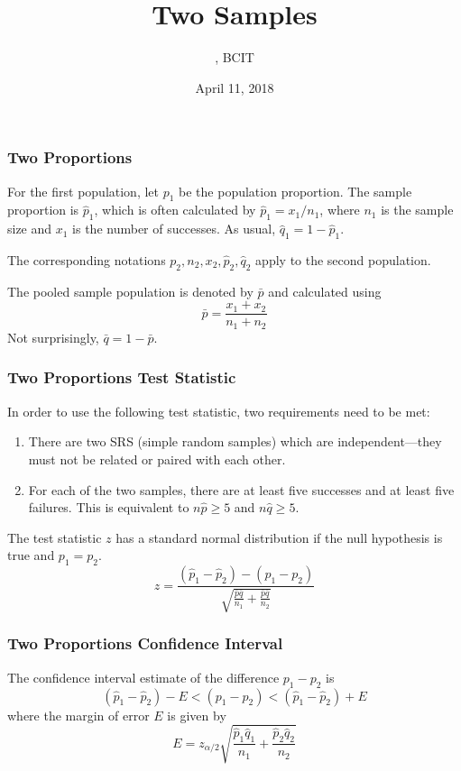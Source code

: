\documentclass[xcolor=dvipsnames]{beamer}
\title{Two Samples}
\subtitle{{\CourseNumber}, BCIT}
\author{\CourseName}
\date{April 11, 2018}
\begin{document}
\begin{frame}
  \titlepage
\end{frame}

\begin{frame}
  \frametitle{Two Proportions}
  For the first population, let $p_{1}$ be the population proportion.
  The sample proportion is $\hat{p}_{1}$, which is often calculated by
  $\hat{p}_{1}=x_{1}/n_{1}$, where $n_{1}$ is the sample size and
  $x_{1}$ is the number of successes. As usual,
  $\hat{q}_{1}=1-\hat{p}_{1}$.

\bigskip

  The corresponding notations
  $p_{2},n_{2},x_{2},\hat{p}_{2},\hat{q}_{2}$ apply to the second
  population.

\bigskip

  The \alert{pooled sample population} is denoted by $\bar{p}$ and
  calculated using
  \begin{equation}
    \label{eq:eefuashi}
    \bar{p}=\frac{x_{1}+x_{2}}{n_{1}+n_{2}}
  \end{equation}
Not surprisingly, $\bar{q}=1-\bar{p}$.
\end{frame}

\begin{frame}
  \frametitle{Two Proportions Test Statistic}
  In order to use the following test statistic, two requirements need
  to be met:
  \begin{enumerate}
  \item There are two SRS (simple random samples) which are
    \alert{independent}---they must not be related or paired with each
    other.
  \item For each of the two samples, there are at least five successes
    and at least five failures. This is equivalent to
    $n\hat{p}\geq{}5$ and $n\hat{q}\geq{}5$.
  \end{enumerate}
The test statistic $z$ has a standard normal distribution if the null
hypothesis is true and $p_{1}=p_{2}$.
\begin{equation}
  \label{eq:ewahgada}
  z=\frac{(\hat{p}_{1}-\hat{p}_{2})-(p_{1}-p_{2})}{\sqrt{\frac{\bar{p}\bar{q}}{n_{1}}+\frac{\bar{p}\bar{q}}{n_{2}}}}
\end{equation}
\end{frame}

\begin{frame}
  \frametitle{Two Proportions Confidence Interval}
  The confidence interval estimate of the difference $p_{1}-p_{2}$ is
  \begin{equation}
    \label{eq:uobaikam}
    (\hat{p}_{1}-\hat{p}_{2})-E<(p_{1}-p_{2})<(\hat{p}_{1}-\hat{p}_{2})+E
  \end{equation}
where the margin of error $E$ is given by
\begin{equation}
  \label{eq:eipoosoo}
  E=z_{\alpha/2}\sqrt{\frac{\hat{p}_{1}\hat{q}_{1}}{n_{1}}+\frac{\hat{p}_{2}\hat{q}_{2}}{n_{2}}}
\end{equation}
\end{frame}
\end{document}
